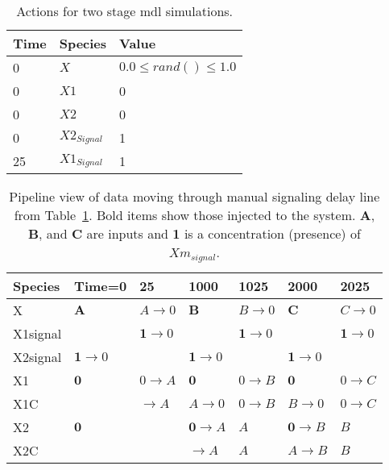 \begin{table}[ht]
	\caption[Two Stage Manual Delay Line Actions]{Actions for two stage \gls{mdl} simulations.}
	\label{tab:as2Man}
	\centering
	\begin{tabular}{lll}
		Time		& Species			& Value 					\\ \hline
		0			& $X$				& $0.0 \le rand() \le 1.0$	\\
		0			& $X1$				& 0							\\
		0			& $X2$				& 0							\\
		0			& $X2_{Signal}$ 	& 1							\\
		25			& $X1_{Signal}$ 	& 1							\\
	\end{tabular}
\end{table}

\begin{table}
	\centering
	\caption[Pipeline View of Data in Two Stage Manual Delay Line]{Pipeline view of data moving through manual signaling delay line from Table~\ref{tab:as2Man}. Bold items show those injected to the system. \textbf{A}, \textbf{B}, and \textbf{C} are inputs and \textbf{1} is a concentration (presence) of $Xm_{signal}$.}
	\label{tab:as2Pipeline}
    \begin{tabular}{l|l|l|l|l|l|l}
    Species  & Time=0                     & 25                         & 1000                       & 1025                       & 2000                       & 2025                       \\ \hline
    X        & $\textbf{A}$               & $A \rightarrow 0$          & $\textbf{B}$               & $B \rightarrow 0$          & $\textbf{C}$               & $C \rightarrow 0$          \\
    X1signal & ~                          & $\textbf{1} \rightarrow 0$ & ~                          & $\textbf{1} \rightarrow 0$ & ~                          & $\textbf{1} \rightarrow 0$ \\
    X2signal & $\textbf{1} \rightarrow 0$ & ~                          & $\textbf{1} \rightarrow 0$ & ~                          & $\textbf{1} \rightarrow 0$ & ~                          \\ \hline
    X1       & $\textbf{0}$               & $0 \rightarrow A$          & $\textbf{0}$               & $0 \rightarrow B$          & $\textbf{0}$               & $0 \rightarrow C$          \\
    X1C      & ~                          & $\rightarrow A$            & $A \rightarrow 0$          & $0 \rightarrow B$          & $B \rightarrow 0$          & $0 \rightarrow C$          \\
    X2       & $\textbf{0}$               & ~                          & $\textbf{0} \rightarrow A$ & $A$                        & $\textbf{0} \rightarrow B$ & $B$                        \\
    X2C      & ~                          & ~                          & $\rightarrow A$            & $A$                        & $A \rightarrow B$          & $B$                        \\
    \end{tabular}
\end{table}

